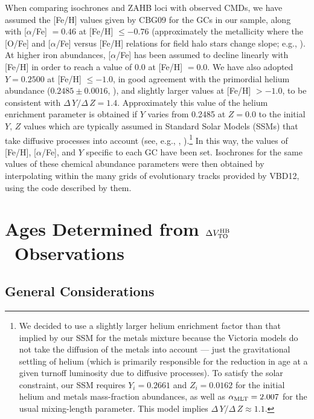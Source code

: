 \documentclass[12pt,preprint]{aastex}
\newcommand\amlt{{\alpha_{\rm MLT}}}
\newcommand\delv{\Delta V^{\rm HB}_{\rm TO}}
\begin{document}
When comparing isochrones and ZAHB loci with observed CMDs, we have assumed the
[Fe/H] values given by CBG09 for the GCs in our sample, along with
[$\alpha$/Fe] $= 0.46$ at [Fe/H] $\le -0.76$ (approximately the metallicity
where the [O/Fe] and [$\alpha$/Fe] versus [Fe/H] relations for field halo stars
change slope; e.g., \citealt{rmc12}).   At higher iron abundances,
[$\alpha$/Fe] has been assumed to decline linearly with [Fe/H]
in order to reach a value of 0.0 at [Fe/H] $= 0.0$.  We have also
adopted $Y = 0.2500$ at [Fe/H] $\le -1.0$, in good agreement
with the primordial helium abundance ($0.2485 \pm 0.0016$, \citealt[][see their
\S 4.8]{ksd11}), and slightly larger values at [Fe/H] $> -1.0$, to be consistent
with $\Delta\,Y/\Delta\,Z = 1.4$.  Approximately this value of the helium
enrichment parameter is obtained if $Y$ varies from 0.2485 at $Z = 0.0$ to the
initial $Y,\,Z$ values which are typically assumed in Standard Solar Models
(SSMs) that take diffusive processes into account (see, e.g., \citealt{bp95},
\citealt{trm98}).\footnote{We decided to use a slightly larger helium enrichment
factor than that implied by our SSM for the \citet{gs98} metals mixture because
the Victoria models do not take the diffusion of the metals into account ---
just the gravitational settling of helium (which is primarily responsible for 
the reduction in age at a given turnoff luminosity due to diffusive processes).
To satisfy the solar constraint, our SSM requires $Y_i = 0.2661$ and $Z_i =
0.0162$ for the initial helium and metals mass-fraction abundances, as well as
$\amlt = 2.007$ for the usual mixing-length parameter.  This model implies
$\Delta\,Y/\Delta\,Z \approx 1.1$.}  In this way, the values of [Fe/H],
[$\alpha$/Fe], and $Y$  specific to each GC have been set.  Isochrones for the
same values of these chemical abundance parameters were then obtained by
interpolating within the many grids of evolutionary tracks provided by
VBD12, using the code described by them.
 

\section{Ages Determined from $\delv$\ Observations}
\label{sec:methods}

\subsection{General Considerations}
\label{subsec:general}
\end{document}
